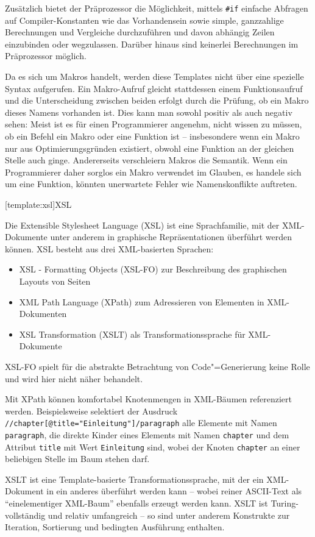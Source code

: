 \documentclass[12pt, a4paper, bibgerm]{scrbook}
\newcommand\icode[1]{\lstinline?#1?}
\newcommand\lsection{}
\newcommand{\cgen}{Code"=Generierung}
\begin{document}
Zusätzlich bietet der Präprozessor die Möglichkeit, mittels \icode{#if}
einfache Abfragen auf Compiler-Konstanten wie das Vorhandensein sowie
simple, ganzzahlige Berechnungen und Vergleiche durchzuführen und davon
abhängig Zeilen einzubinden oder wegzulassen. Darüber hinaus sind
keinerlei Berechnungen im Präprozessor möglich.

Da es sich um Makros handelt, werden diese Templates nicht über eine
spezielle Syntax aufgerufen. Ein Makro-Aufruf gleicht stattdessen einem
Funktionsaufruf und die Unterscheidung zwischen beiden erfolgt durch die
Prüfung, ob ein Makro dieses Namens vorhanden ist. Dies kann man sowohl
positiv als auch negativ sehen: Meist ist es für einen Programmierer
angenehm, nicht wissen zu müssen, ob ein Befehl ein Makro oder eine
Funktion ist -- insbesondere wenn ein Makro nur aus Optimierungsgründen
existiert, obwohl eine Funktion an der gleichen Stelle auch
ginge. Andererseits verschleiern Makros die Semantik. Wenn ein
Programmierer daher sorglos ein Makro verwendet im Glauben, es handele
sich um eine Funktion, könnten unerwartete Fehler wie Namenskonflikte
auftreten.

\lsection[template:xsl]{XSL}

Die Extensible Stylesheet Language (XSL) \cite{XSLT} ist eine
Sprachfamilie, mit der XML-Dokumente unter anderem in graphische
Repräsentationen überführt werden können. XSL besteht aus drei
XML-basierten Sprachen:
\begin{itemize}
\item XSL - Formatting Objects (XSL-FO) zur Beschreibung des graphischen Layouts von Seiten
\item XML Path Language (XPath) zum Adressieren von Elementen in XML-Dokumenten
\item XSL Transformation (XSLT) als Transformationssprache für XML-Dokumente
\end{itemize}
XSL-FO spielt für die abstrakte Betrachtung von \cgen{} keine Rolle und
wird hier nicht näher behandelt.

Mit XPath können komfortabel Knotenmengen in XML-Bäumen referenziert
werden. Beispielsweise selektiert der Ausdruck
\icode{//chapter[@title="Einleitung"]/paragraph} alle Elemente mit Namen
\icode{paragraph}, die direkte Kinder eines Elements mit Namen
\icode{chapter} und dem Attribut \icode{title} mit Wert
\icode{Einleitung} sind, wobei der Knoten \icode{chapter} an einer
beliebigen Stelle im Baum stehen darf.

XSLT ist eine Template-basierte Transformationssprache, mit der ein
XML-Dokument in ein anderes überführt werden kann -- wobei reiner
ASCII-Text als "`einelementiger XML-Baum"' ebenfalls erzeugt werden
kann. XSLT ist Turing-vollständig und relativ umfangreich -- so sind
unter anderem Konstrukte zur Iteration, Sortierung und bedingten
Ausführung enthalten. 
\end{document}
